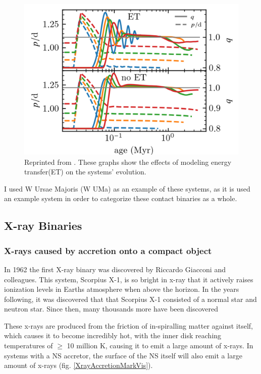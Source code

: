 \documentclass[12pt, a4paper]{article}
\begin{document}
        \begin{figure}[H]
            \centering
            \includegraphics[scale = .3]{figs/reused-figs/q-ratio_evolution_farby.png}
            \caption{Reprinted from \cite{Fabry_2025}. These graphs show the effects of modeling energy transfer(ET) on the systems' evolution.}
            \label{qEvolution}
        \end{figure}

        
        I used W Ursae Majoris (W UMa) as an example of these systems, as it is used an example system in order to categorize these contact binaries as a whole.
    \subsection{X-ray Binaries} 
        \subsubsection{X-rays caused by accretion onto a compact object} \label{XrayAccretion}
            In 1962 the first X-ray binary was discovered by Riccardo Giacconi and colleagues. This system, Scorpius X-1, is so bright in x-ray that it actively raises ionization levels in Earths atmosphere when above the horizon. \cite{TaurisvandenHeuvel+2023} \cite{Giacconi_1962} In the years following, it was discovered that that Scorpius X-1 consisted of a normal star and neutron star. Since then, many thousands more have been discovered\cite{Haardt_1993}

            These x-rays are produced from the friction of in-spiralling matter against itself, which causes it to become incredibly hot, with the inner disk reaching temperatures of $\geq$ 10 million K, causing it to emit a large amount of x-rays. In systems with a NS accretor, the surface of the NS itself will also emit a large amount of x-rays \cite{TaurisvandenHeuvel+2023} (fig. \ref{XrayAccretionMarkVis}). 
\end{document}
